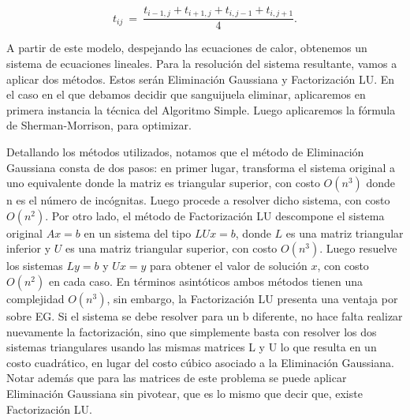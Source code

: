 \begin{equation}
t_{ij} \ =\ \frac{ t_{i-1,j} + t_{i+1,j} + t_{i,j-1} + t_{i,j+1}}{4}.\label{eq:calordd}
\end{equation}



A partir de este modelo, despejando las ecuaciones de calor, obtenemos un sistema de ecuaciones lineales. Para la resolución del sistema resultante, vamos a aplicar dos métodos. Estos serán Eliminación Gaussiana y Factorización LU. En el caso en el que debamos decidir que sanguijuela eliminar, aplicaremos en primera instancia la técnica del Algoritmo Simple. Luego aplicaremos la fórmula de Sherman-Morrison, para optimizar. 

Detallando los métodos utilizados, notamos que el método de Eliminación Gaussiana consta de dos pasos: en primer lugar, transforma el sistema original a uno equivalente donde la matriz es triangular superior, con costo $O(n^3)$ donde n es el número de incógnitas. Luego procede a resolver dicho sistema, con costo $O(n^2)$. Por otro lado, el método de Factorización LU descompone el sistema original
$Ax = b$ en un sistema del tipo $LUx = b$, donde $L$ es una matriz triangular inferior y $U$ es una matriz triangular superior, con costo $O(n^3)$. Luego resuelve los sistemas $Ly = b$ y $Ux = y$ para obtener el valor de solución $x$, con costo $O(n^2)$ en cada caso. En términos asintóticos ambos métodos tienen una complejidad $O(n^3)$, sin embargo, la Factorización LU presenta una ventaja por sobre EG. Si el sistema se debe resolver para un b diferente, no hace falta realizar nuevamente la factorización, sino que simplemente basta con resolver los dos sistemas triangulares usando las mismas matrices L y U lo que resulta en un costo cuadrático, en lugar del costo cúbico asociado a la Eliminación Gaussiana. \\
Notar además que para las matrices de este problema se puede aplicar Eliminación Gaussiana sin pivotear, que es lo mismo que decir que, existe Factorización LU.
